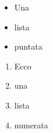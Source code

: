 \begin{itemize}
\item Una
\item lista
\item puntata
\end{itemize}


\begin{enumerate}
\item Ecco
\item una
\item lista
\item numerata
\end{enumerate}
